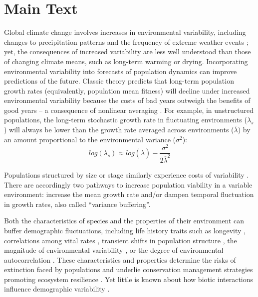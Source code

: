 \documentclass[12pt]{article}
\begin{document}
\section*{Main Text}

Global climate change involves increases in environmental variability, including changes to precipitation patterns and the frequency of extreme weather events \cite{seneviratne2012changes,stocker2013technical, ipcc_2021};
yet, the consequences of increased variability are less well understood than those of changing climate means, such as long-term warming or drying. 
Incorporating environmental variability into forecasts of population dynamics can improve predictions of the future.
Classic theory predicts that long-term population growth rates (equivalently, population mean fitness) will decline under increased environmental variability because the costs of bad years outweigh the benefits of good years -- a consequence of nonlinear averaging \cite{lewontin_population_1969,tuljapurkar_population_1982}.
For example, in unstructured populations, the long-term stochastic growth rate in fluctuating environments ($\lambda_s$) will always be lower than the growth rate averaged across environments ($\overline{\lambda}$) by an amount proportional to the environmental variance ($\sigma^2$): 
\begin{equation}
	 log(\lambda_s)  \approx log(\overline{\lambda}) - \frac{\sigma^2}{2\overline{\lambda}^2}
\end{equation}

\noindent Populations structured by size or stage similarly experience costs of variability \cite{cohen1979comparative,tuljapurkar2013population}.
There are accordingly two pathways to increase population viability in a variable environment: increase the mean growth rate and/or dampen temporal fluctuation in growth rates, also called ``variance buffering''.

Both the characteristics of species and the properties of their environment can buffer demographic fluctuations, including life history traits such as longevity \cite{pfister1998patterns, morris2008longevity}, correlations among vital rates \cite{compagnoni2016effect}, transient shifts in population structure \cite{ellis2013role}, the magnitude of environmental variability \cite{rodriguez2021limits}, or the degree of environmental autocorrelation \cite{tuljapurkar1980population,fieberg2001stochastic}. 
These characteristics and properties determine the risks of extinction faced by populations \cite{menges2000applications} and underlie conservation management strategies promoting ecosystem resilience \cite{kuparinen2016fishing}. 
Yet little is known about how biotic interactions influence demographic variability \cite{hilde_demographic_2020}. 
\end{document}
